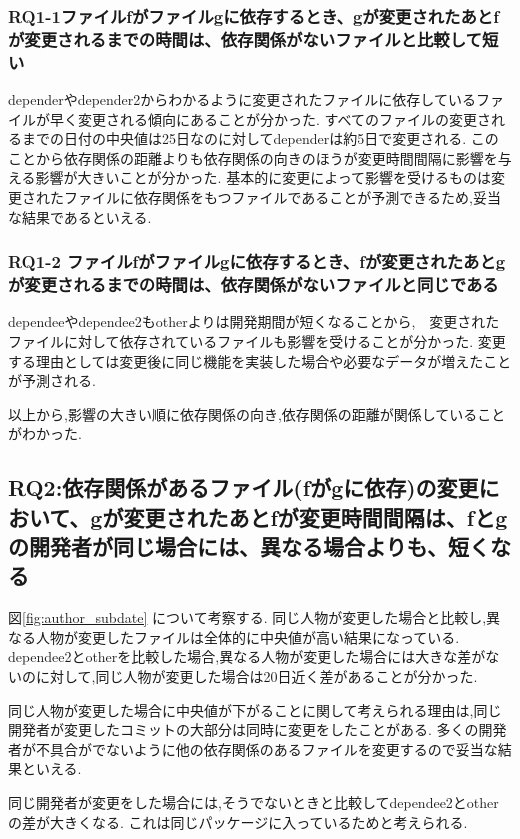 \documentclass{fose2016}           %
\begin{document}
\subsubsection*{RQ1-1ファイルfがファイルgに依存するとき、gが変更されたあとfが変更されるまでの時間は、依存関係がないファイルと比較して短い}
dependerやdepender2からわかるように変更されたファイルに依存しているファイルが早く変更される傾向にあることが分かった.
すべてのファイルの変更されるまでの日付の中央値は25日なのに対してdependerは約5日で変更される.
このことから依存関係の距離よりも依存関係の向きのほうが変更時間間隔に影響を与える影響が大きいことが分かった.
基本的に変更によって影響を受けるものは変更されたファイルに依存関係をもつファイルであることが予測できるため,妥当な結果であるといえる.

\subsubsection*{RQ1-2 ファイルfがファイルgに依存するとき、fが変更されたあとgが変更されるまでの時間は、依存関係がないファイルと同じである}
dependeeやdependee2もotherよりは開発期間が短くなることから,　変更されたファイルに対して依存されているファイルも影響を受けることが分かった.
変更する理由としては変更後に同じ機能を実装した場合や必要なデータが増えたことが予測される.

以上から,影響の大きい順に依存関係の向き,依存関係の距離が関係していることがわかった.


\subsection{RQ2:依存関係があるファイル(fがgに依存)の変更において、gが変更されたあとfが変更時間間隔は、fとgの開発者が同じ場合には、異なる場合よりも、短くなる}
図\ref{fig:author_subdate}  について考察する.
同じ人物が変更した場合と比較し,異なる人物が変更したファイルは全体的に中央値が高い結果になっている.
dependee2とotherを比較した場合,異なる人物が変更した場合には大きな差がないのに対して,同じ人物が変更した場合は20日近く差があることが分かった.

同じ人物が変更した場合に中央値が下がることに関して考えられる理由は,同じ開発者が変更したコミットの大部分は同時に変更をしたことがある.
多くの開発者が不具合がでないように他の依存関係のあるファイルを変更するので妥当な結果といえる.

同じ開発者が変更をした場合には,そうでないときと比較してdependee2とotherの差が大きくなる.
これは同じパッケージに入っているためと考えられる.

\end{document}
